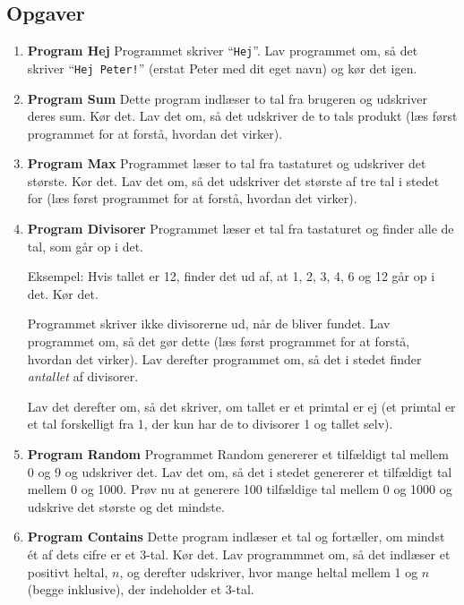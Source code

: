 \documentclass[12pt]{article}
\begin{document}
\subsection*{Opgaver}
\begin{enumerate}
\item {\bf Program Hej} \newline
Programmet skriver ``\texttt{Hej}''.
Lav programmet om, så det skriver ``\texttt{Hej Peter!}''
(erstat Peter med dit eget navn) og kør det igen.

\item {\bf Program Sum} \newline
Dette program indlæser to tal fra brugeren og
udskriver deres sum. Kør det. Lav det om, så det udskriver de
to tals produkt (læs først programmet for at forstå, hvordan det virker).


\item {\bf Program Max} \newline
Programmet læser to tal fra tastaturet og
udskriver det største. Kør det. Lav det om, så det udskriver
det største af tre tal i stedet for (læs først programmet for at forstå,
hvordan det virker).


\item {\bf Program Divisorer} \newline
Programmet læser et tal fra tastaturet og finder
alle de tal, som går op i det.

Eksempel: Hvis tallet er 12, finder det ud af, at
1, 2, 3, 4, 6 og 12 går op i det. Kør det.

Programmet skriver ikke divisorerne ud, når de bliver fundet. Lav
programmet om, så det gør dette (læs først programmet for at forstå,
hvordan det virker). Lav derefter programmet om, så det i stedet finder
\emph{antallet} af divisorer.

Lav det derefter om, så det skriver, om
tallet er et primtal er ej (et primtal er et tal forskelligt fra 1, der kun har de to divisorer 1 og
tallet selv).

\item {\bf Program Random} \newline
Programmet Random genererer et tilfældigt tal mellem 0 og 9 og udskriver det.
Lav det om, så det i stedet genererer et tilfældigt tal mellem 0 og 1000.
Prøv nu at generere 100 tilfældige tal mellem 0 og 1000 og udskrive det største
og det mindste.

\item {\bf Program Contains} \newline
Dette program indlæser et tal og fortæller, om mindst ét af dets cifre er et 3-tal.
Kør det. Lav programmmet om, så det indlæser et positivt heltal, $n$, og derefter udskriver, hvor mange heltal
mellem 1 og $n$ (begge inklusive), der indeholder et 3-tal.


\end{enumerate}
\end{document}
